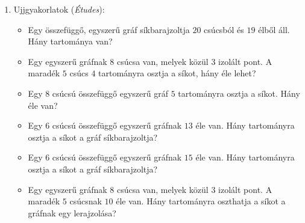 \documentclass[a4paper, 12pt]{article}
\begin{document}
\begin{enumerate}
            \item Ujjgyakorlatok (\textit{Études}):
            \begin{itemize}
                \item Egy összefüggő, egyszerű gráf síkbarajzoltja $20$ csúcsból és $19$ élből áll. Hány tartománya van?
                \item Egy egyszerű gráfnak $8$ csúcsa van, melyek közül $3$ izolált pont. A maradék $5$ csúcs $4$ tartományra osztja a síkot, hány éle lehet?
                \item Egy $8$ csúcsú összefüggő egyszerű gráf $5$ tartományra osztja a síkot. Hány éle van?
                \item Egy $6$ csúcsú összefüggő egyszerű gráfnak $13$ éle van. Hány tartományra osztja a síkot a gráf síkbarajzoltja?
                \item Egy $6$ csúcsú összefüggő egyszerű gráfnak $15$ éle van. Hány tartományra osztja a síkot a gráf síkbarajzoltja?
                \item Egy egyszerű gráfnak $8$ csúcsa van, melyek közül $3$ izolált pont. A maradék $5$ csúcsnak $10$ éle van. Hány tartományra oszthatja a síkot a gráfnak egy lerajzolása?
            \end{itemize}
        

\end{enumerate}
\end{document}
